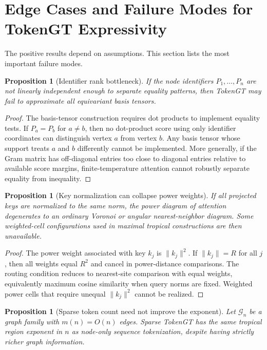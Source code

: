 \documentclass[11pt]{article}
\newtheorem{proposition}[theorem]{Proposition}
\newcommand{\cG}{\mathcal{G}}
\begin{document}
\section{Edge Cases and Failure Modes for TokenGT Expressivity}

The positive results depend on assumptions.  This section lists the most important failure modes.

\begin{proposition}[Identifier rank bottleneck]
If the node identifiers $P_1,\dots,P_n$ are not linearly independent enough to separate equality patterns, then TokenGT may fail to approximate all equivariant basis tensors.
\end{proposition}

\begin{proof}
The basis-tensor construction requires dot products to implement equality tests.  If $P_a=P_b$ for $a\ne b$, then no dot-product score using only identifier coordinates can distinguish vertex $a$ from vertex $b$.  Any basis tensor whose support treats $a$ and $b$ differently cannot be implemented.  More generally, if the Gram matrix has off-diagonal entries too close to diagonal entries relative to available score margins, finite-temperature attention cannot robustly separate equality from inequality.
\end{proof}

\begin{proposition}[Key normalization can collapse power weights]
If all projected keys are normalized to the same norm, the power diagram of attention degenerates to an ordinary Voronoi or angular nearest-neighbor diagram.  Some weighted-cell configurations used in maximal tropical constructions are then unavailable.
\end{proposition}

\begin{proof}
The power weight associated with key $k_j$ is $\|k_j\|^2$.  If $\|k_j\|=R$ for all $j$, then all weights equal $R^2$ and cancel in power-distance comparisons.  The routing condition reduces to nearest-site comparison with equal weights, equivalently maximum cosine similarity when query norms are fixed.  Weighted power cells that require unequal $\|k_j\|^2$ cannot be realized.
\end{proof}

\begin{proposition}[Sparse token count need not improve the exponent]
Let $\cG_n$ be a graph family with $m(n)=O(n)$ edges.  Sparse TokenGT has the same tropical region exponent in $n$ as node-only sequence tokenization, despite having strictly richer graph information.
\end{proposition}
\end{document}
